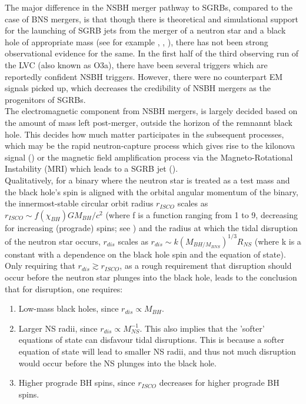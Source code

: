     The major difference in the NSBH merger pathway to SGRBs, compared to the case of
    BNS mergers, is that though there is theoretical and simulational support for the
    launching of SGRB jets from the merger of a neutron star and a black hole of
    appropriate mass (see for example \cite{ruiz_2020}, \cite{shibata_2019},
    \cite{foucart_2020}), there has not been strong observational evidence for the same.
    In the first half of the third observing run of the LVC (also known as O3a), there
    have been several triggers which are reportedly confident NSBH triggers. However,
    there were no counterpart EM signals picked up, which decreases the credibility of
    NSBH mergers as the progenitors of SGRBs.\\
    The electromagnetic component from NSBH mergers, is largely decided based on the
    amount of mass left post-merger, outside the horizon of the remnannt black hole.
    This decides how much matter participates in the subsequent processes, which may be
    the rapid neutron-capture process which gives rise to the kilonova signal
    (\cite{metzger_2019}) or the magnetic field amplification process via the
    Magneto-Rotational Instability (MRI) which leads to a SGRB jet
    (\cite{postnov_2019}).\\
    Qualitatively, for a binary where the neutron star is treated as a test mass and the
    black hole's spin is aligned with the orbital angular momentum of the binary, the
    innermost-stable circular orbit radius $r_{ISCO}$ scales as $r_{ISCO} \sim
    f(\chi_{BH}) G M_{BH}/c^2$ (where f is a function ranging from 1 to 9, decreasing
    for increasing (prograde) spins; see \cite{bardeen_1972}) and the radius at which
    the tidal disruption of the neutron star occurs, $r_{dis}$ scales as $r_{dis} \sim k
    (M_{BH/M_{BNS}})^{1/3} R_{NS}$ (where k is a constant with a dependence on the black
    hole spin and the equation of state). Only requiring that $r_{dis} \gtrsim
    r_{ISCO}$, as a rough requirement that disruption should occur before the neutron
    star plunges into the black hole, leads to the conclusion that for disruption, one
    requires:

    \begin{enumerate}[label=\alph*.)]

        \item Low-mass black holes, since $r_{dis} \propto M_{BH}$.

        \item Larger NS radii, since $r_{dis} \propto M_{NS}^{-1}$. This also implies
            that the 'softer' equations of state can disfavour tidal disruptions. This
            is because a softer equation of state will lead to smaller NS radii, and
            thus not much disruption would occur before the NS plunges into the black
            hole.

        \item Higher prograde BH spins, since $r_{ISCO}$ decreases for higher prograde
            BH spins.

    \end{enumerate}

